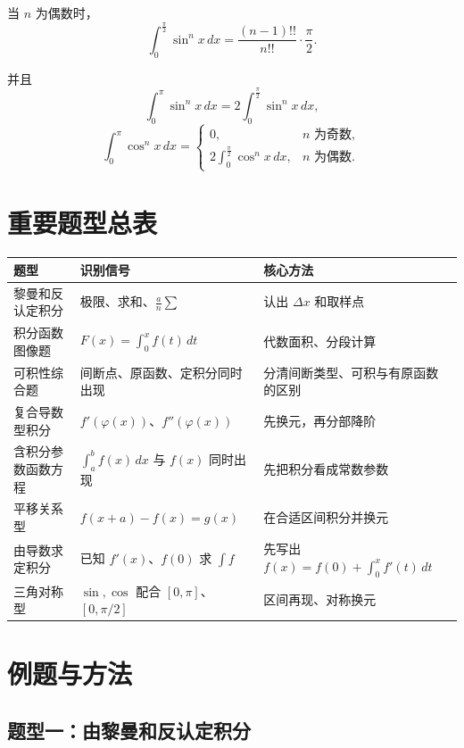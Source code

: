 \documentclass[12pt,a4paper]{ctexart}
\begin{document}
当 $n$ 为偶数时，
\[
\int_0^{\frac{\pi}{2}}\sin^n x\,dx
=
\frac{(n-1)!!}{n!!}\cdot\frac{\pi}{2}.
\]

并且
\[
\int_0^\pi \sin^n x\,dx=2\int_0^{\frac{\pi}{2}}\sin^n x\,dx,
\]
\[
\int_0^\pi \cos^n x\,dx=
\begin{cases}
0,& n\text{ 为奇数},\\
2\int_0^{\frac{\pi}{2}}\cos^n x\,dx,& n\text{ 为偶数}.
\end{cases}
\]

\section{重要题型总表}

\begin{center}
\renewcommand{\arraystretch}{1.35}
\begin{tabular}{>{\raggedright\arraybackslash}p{} >{\raggedright\arraybackslash}p{} >{\raggedright\arraybackslash}p{}}
\toprule
题型 & 识别信号 & 核心方法 \\
\midrule
黎曼和反认定积分 & 极限、求和、$\frac{a}{n}\sum$ & 认出 $\Delta x$ 和取样点 \\
积分函数图像题 & $F(x)=\int_0^x f(t)\,dt$ & 代数面积、分段计算 \\
可积性综合题 & 间断点、原函数、定积分同时出现 & 分清间断类型、可积与有原函数的区别 \\
复合导数型积分 & $f'(\varphi(x))$、$f''(\varphi(x))$ & 先换元，再分部降阶 \\
含积分参数函数方程 & $\int_a^b f(x)\,dx$ 与 $f(x)$ 同时出现 & 先把积分看成常数参数 \\
平移关系型 & $f(x+a)-f(x)=g(x)$ & 在合适区间积分并换元 \\
由导数求定积分 & 已知 $f'(x)$、$f(0)$ 求 $\int f$ & 先写出 $f(x)=f(0)+\int_0^x f'(t)\,dt$ \\
三角对称型 & $\sin,\cos$ 配合 $[0,\pi]$、$[0,\pi/2]$ & 区间再现、对称换元 \\
\bottomrule
\end{tabular}
\end{center}

\section{例题与方法}

\subsection{题型一：由黎曼和反认定积分}
\end{document}
